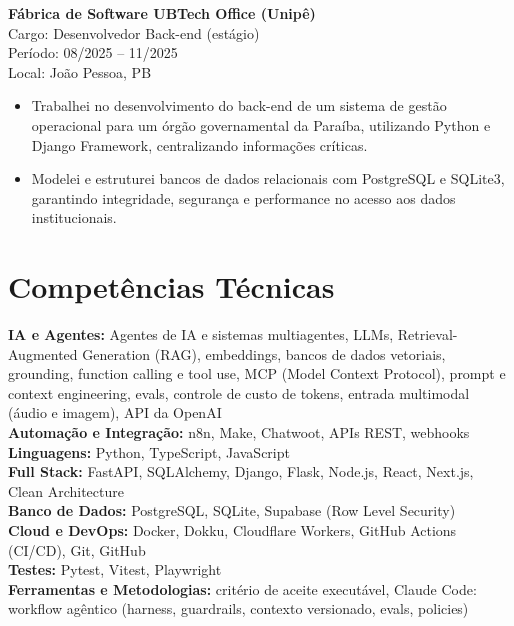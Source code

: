 \documentclass[10pt,a4paper]{article}
\begin{document}

\textbf{Fábrica de Software UBTech Office (Unipê)} \\
Cargo: Desenvolvedor Back-end (estágio) \\
Período: 08/2025 -- 11/2025 \\
Local: João Pessoa, PB

\begin{itemize}
\item Trabalhei no desenvolvimento do back-end de um sistema de gestão
operacional para um órgão governamental da Paraíba, utilizando Python e Django
Framework, centralizando informações críticas.
\item Modelei e estruturei bancos de dados relacionais com PostgreSQL e
SQLite3, garantindo integridade, segurança e performance no acesso aos dados
institucionais.
\end{itemize}

\section*{Competências Técnicas}

\textbf{IA e Agentes:} Agentes de IA e sistemas multiagentes, LLMs,
Retrieval-Augmented Generation (RAG), embeddings, bancos de dados vetoriais,
grounding, function calling e tool use, MCP (Model Context Protocol), prompt e
context engineering, evals, controle de custo de tokens, entrada multimodal
(áudio e imagem), API da OpenAI \\
\textbf{Automação e Integração:} n8n, Make, Chatwoot, APIs REST, webhooks \\
\textbf{Linguagens:} Python, TypeScript, JavaScript \\
\textbf{Full Stack:} FastAPI, SQLAlchemy, Django, Flask, Node.js, React,
Next.js, Clean Architecture \\
\textbf{Banco de Dados:} PostgreSQL, SQLite, Supabase (Row Level Security) \\
\textbf{Cloud e DevOps:} Docker, Dokku, Cloudflare Workers, GitHub Actions
(CI/CD), Git, GitHub \\
\textbf{Testes:} Pytest, Vitest, Playwright \\
\textbf{Ferramentas e Metodologias:} critério de aceite executável,
Claude Code: workflow agêntico (harness, guardrails, contexto versionado,
evals, policies)
\end{document}
